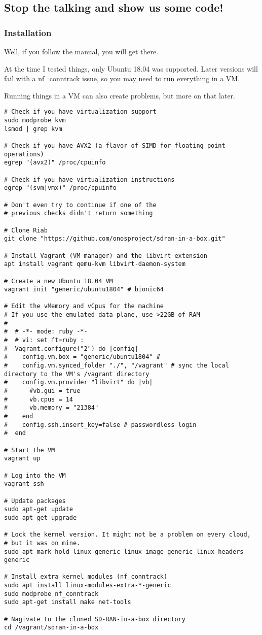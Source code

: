 \documentclass{article}
\begin{document}
    \subsection{Stop the talking and show us some code!}
        \subsubsection{Installation}

            Well, if you follow the manual, you will get there.

            At the time I tested things, only Ubuntu 18.04 was supported.
            Later versions will fail with a nf\_conntrack issue, so you may need to run everything in a VM.

            Running things in a VM can also create problems, but more on that later.

\begin{verbatim}
# Check if you have virtualization support
sudo modprobe kvm
lsmod | grep kvm

# Check if you have AVX2 (a flavor of SIMD for floating point operations)
egrep "(avx2)" /proc/cpuinfo

# Check if you have virtualization instructions
egrep "(svm|vmx)" /proc/cpuinfo

# Don't even try to continue if one of the
# previous checks didn't return something

# Clone Riab
git clone "https://github.com/onosproject/sdran-in-a-box.git"

# Install Vagrant (VM manager) and the libvirt extension
apt install vagrant qemu-kvm libvirt-daemon-system

# Create a new Ubuntu 18.04 VM
vagrant init "generic/ubuntu1804" # bionic64

# Edit the vMemory and vCpus for the machine
# If you use the emulated data-plane, use >22GB of RAM
#
#  # -*- mode: ruby -*-
#  # vi: set ft=ruby :
#  Vagrant.configure("2") do |config|
#    config.vm.box = "generic/ubuntu1804" #
#    config.vm.synced_folder "./", "/vagrant" # sync the local directory to the VM's /vagrant directory
#    config.vm.provider "libvirt" do |vb|
#      #vb.gui = true
#      vb.cpus = 14
#      vb.memory = "21384"
#    end
#    config.ssh.insert_key=false # passwordless login
#  end

# Start the VM
vagrant up

# Log into the VM
vagrant ssh

# Update packages
sudo apt-get update
sudo apt-get upgrade

# Lock the kernel version. It might not be a problem on every cloud,
# but it was on mine.
sudo apt-mark hold linux-generic linux-image-generic linux-headers-generic

# Install extra kernel modules (nf_conntrack)
sudo apt install linux-modules-extra-*-generic
sudo modprobe nf_conntrack
sudo apt-get install make net-tools

# Nagivate to the cloned SD-RAN-in-a-box directory
cd /vagrant/sdran-in-a-box
\end{verbatim}
\end{document}
